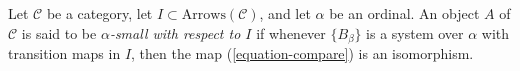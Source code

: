 \begin{definition}
\label{definition-small}
Let $\mathcal{C}$ be a category, let $I \subset \text{Arrows}(\mathcal{C})$,
and let $\alpha$ be an ordinal. An object $A$ of $\mathcal{C}$ is said to
be {\it $\alpha$-small with respect to $I$} if whenever $\{B_\beta\}$ is
a system over $\alpha$ with transition maps in $I$, then
the map (\ref{equation-compare}) is an isomorphism.
\end{definition}